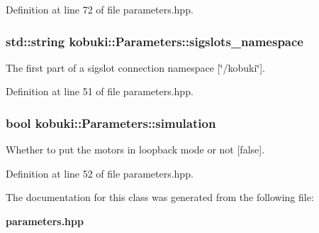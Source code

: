\-Definition at line 72 of file parameters.\-hpp.

\subsubsection[{sigslots\-\_\-namespace}]{\setlength{\rightskip}{0pt plus 5cm}std\-::string {\bf kobuki\-::\-Parameters\-::sigslots\-\_\-namespace}}\label{classkobuki_1_1Parameters_a0717933338e84bc7907f7e8345e2347e}


\-The first part of a sigslot connection namespace [\char`\"{}/kobuki\char`\"{}]. 



\-Definition at line 51 of file parameters.\-hpp.

\subsubsection[{simulation}]{\setlength{\rightskip}{0pt plus 5cm}bool {\bf kobuki\-::\-Parameters\-::simulation}}\label{classkobuki_1_1Parameters_afb674fc8606ffb15482a4230293cae6c}


\-Whether to put the motors in loopback mode or not [false]. 



\-Definition at line 52 of file parameters.\-hpp.



\-The documentation for this class was generated from the following file\-:\begin{DoxyCompactItemize}
\item 
{\bf parameters.\-hpp}\end{DoxyCompactItemize}

